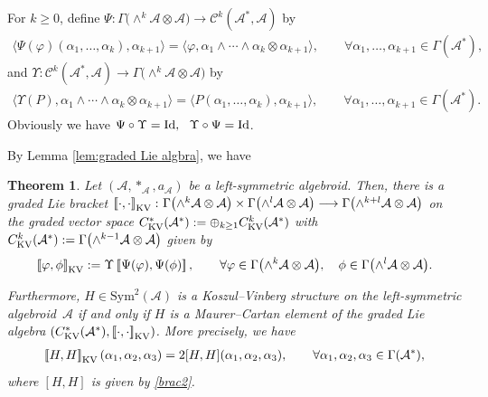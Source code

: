 \documentclass[pdftex]{sigma}%
\numberwithin{equation}{section}
\newtheorem{thm}{Theorem}[section]
\newcommand{\huaA}{\mathcal{A}}
\newcommand{\huaC}{\mathcal{C}}
\newcommand{\Courant}[1]{\left[\!\left[ #1\right]\!\right]}
\newcommand{\Id}{\rm{Id}}
\newcommand{\Sym}{\mathrm{Sym}}
\begin{document}
For $k\geq0$, define $\Psi\colon \Gamma\big({\wedge}^{k}\huaA\otimes \huaA\big)\longrightarrow\huaC^k(\huaA^*,\huaA) $ by
\begin{gather}\label{eq:relation-coboundary} \langle\Psi(\varphi)(\alpha_1,\dots,\alpha_k),\alpha_{k+1}\rangle =\langle\varphi,\alpha_1\wedge\cdots\wedge\alpha_k\otimes\alpha_{k+1}\rangle,\qquad
\forall \alpha_1,\dots,\alpha_{k+1}\in\Gamma(\huaA^*),
\end{gather}
and $\Upsilon\colon \huaC^k(\huaA^*,\huaA) \longrightarrow \Gamma\big({\wedge}^{k}\huaA\otimes \huaA\big)$ by
\begin{gather*}%
\langle \Upsilon(P),\alpha_1\wedge\cdots\wedge\alpha_k\otimes\alpha_{k+1}\rangle=\langle P(\alpha_1,\dots,\alpha_k),\alpha_{k+1}\rangle,\qquad
\forall \alpha_1,\dots,\alpha_{k+1}\in\Gamma(\huaA^*).
\end{gather*}
Obviously we have $\Psi\circ\Upsilon={\Id},~~\Upsilon\circ\Psi={\Id}$.


By Lemma \ref{lem:graded Lie algbra}, we have
\begin{thm}
Let $(\huaA,\ast_\huaA,a_\huaA)$ be a left-symmetric algebroid. Then, there is a graded Lie bracket $\Courant{\cdot,\cdot}_{\rm KV}\colon \Gamma\big({\wedge}^{k}\huaA\otimes \huaA\big)\times \Gamma\big({\wedge}^{l}\huaA\otimes \huaA\big)\longrightarrow \Gamma\big({\wedge}^{k+l}\huaA\otimes \huaA\big)$ on the graded vector space $C_{\rm KV}^{*}(\huaA^*):=\oplus_{k\ge 1}C_{\rm KV}^{k}(\huaA^*)$ with $C_{\rm KV}^{k}(\huaA^*):=\Gamma\big({\wedge}^{k-1}\huaA\otimes \huaA\big)$ given by
\begin{gather*}
\Courant{\varphi,\phi}_{\rm KV}:=\Upsilon\Courant{\Psi(\varphi),\Psi(\phi)},\qquad
\forall \varphi\in\Gamma\big({\wedge}^{k}\huaA\otimes \huaA\big),\quad\phi\in\Gamma\big({\wedge}^{l}\huaA\otimes \huaA\big).
\end{gather*}

Furthermore, $H\in \Sym^2(\huaA)$ is a Koszul--Vinberg structure on the left-symmetric algebroid~$\huaA$ if and only if $H$ is a Maurer--Cartan element of the graded Lie algebra $(C_{\rm KV}^{*}(\huaA^*),\Courant{\cdot,\cdot}_{\rm KV})$. More precisely, we have
 \begin{gather*}
\Courant{H,H}_{\rm KV}(\alpha_1,\alpha_2,\alpha_3)=2[H,H](\alpha_1,\alpha_2,\alpha_3),\qquad \forall \alpha_1,\alpha_2,\alpha_3\in\Gamma(\huaA^*),
 \end{gather*}
 where $[H,H]$ is given by \eqref{brac2}.
\end{thm}
\end{document}
